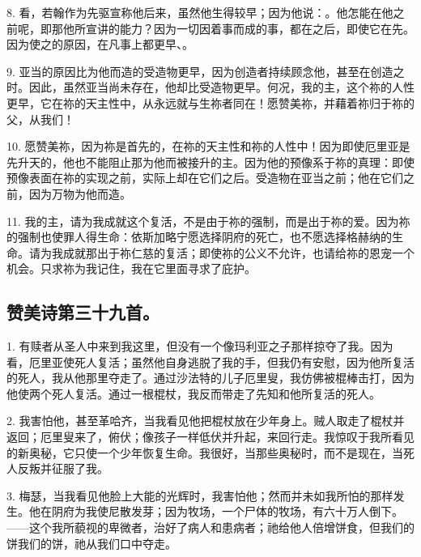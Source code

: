 8. 看，若翰作为先驱宣称他后来，虽然他生得较早；因为他说：。他怎能在他之前呢，即那他所宣讲的能力？因为一切因着事而成的事，都在之后，即使它在先。因为使之的原因，在凡事上都更早、。\par

9. 亚当的原因比为他而造的受造物更早，因为创造者持续顾念他，甚至在创造之时。因此，虽然亚当尚未存在，他却比受造物更早。何况，我的主，这个祢的人性更早，它在祢的天主性中，从永远就与生祢者同在！愿赞美祢，并藉着祢归于祢的父，从我们！\par

10. 愿赞美祢，因为祢是首先的，在祢的天主性和祢的人性中！因为即使厄里亚是先升天的，他也不能阻止那为他而被接升的主。因为他的预像系于祢的真理：即使预像表面在祢的实现之前，实际上却在它们之后。受造物在亚当之前；他在它们之前，因为万物为他而造。\par

11. 我的主，请为我成就这个复活，不是由于祢的强制，而是出于祢的爱。因为祢的强制也使罪人得生命：依斯加略宁愿选择阴府的死亡，也不愿选择格赫纳的生命。请为我成就那出于祢仁慈的复活；即使祢的公义不允许，也请给祢的恩宠一个机会。只求祢为我记住，我在它里面寻求了庇护。\par


\subsection{赞美诗第三十九首。}

1. 有赎者从圣人中来到我这里，但没有一个像玛利亚之子那样掠夺了我。因为看，厄里亚使死人复活；虽然他自身逃脱了我的手，但我仍有安慰，因为他所复活的死人，我从他那里夺走了。通过沙法特的儿子厄里叟，我仿佛被棍棒击打，因为他使两个死人复活。通过一根棍杖，我反而带走了先知和他所复活的死人。\par

2. 我害怕他，甚至革哈齐，当我看见他把棍杖放在少年身上。贼人取走了棍杖并返回；厄里叟来了，俯伏；像孩子一样低伏并升起，来回行走。我惊叹于我所看见的新奥秘，它只使一个少年恢复生命。我很好，当那些奥秘时，而不是现在，当死人反叛并征服了我。\par

3. 梅瑟，当我看见他脸上大能的光辉时，我害怕他；然而并未如我所怕的那样发生。他在阴府为我使尼散发芽；因为牧场，一个尸体的牧场，有六十万人倒下。——这个我所藐视的卑微者，治好了病人和患病者；祂给他人倍增饼食，但我们的饼我们的饼，祂从我们口中夺走。\par

